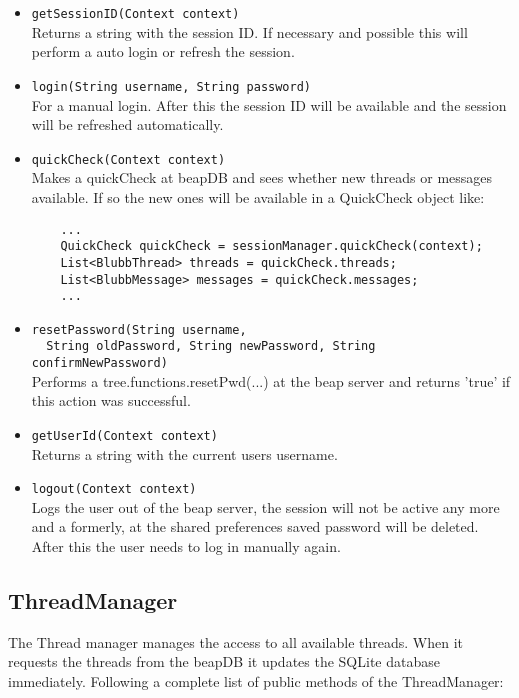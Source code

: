 \documentclass[12pt,a4paper,oneside]{report}
\newcommand{\beapDB}{beapDB}
\newcommand{\beapServer}{beap server}
\newcommand{\code}[1]{\lstinline{#1}}
\begin{document}
\begin{itemize}
\item{\code{getSessionID(Context context)}}\\
Returns a string with the session ID. If necessary and possible this will perform a auto login or refresh the session.

\item{\code{login(String username, String password)}}\\
For a manual login. After this the session ID will be available and the session will be refreshed automatically.

\item{\code{quickCheck(Context context)}}\\
Makes a quickCheck at \beapDB{} and sees whether new threads or messages available. If so the new ones will be available in a QuickCheck object like: 
\begin{lstlisting}
	...
	QuickCheck quickCheck = sessionManager.quickCheck(context);
	List<BlubbThread> threads = quickCheck.threads;
	List<BlubbMessage> messages = quickCheck.messages;
	...
\end{lstlisting}

\item{\code{resetPassword(String username,}\\
\code{	String oldPassword, String newPassword, String confirmNewPassword)}}\\
Performs a tree.functions.resetPwd(...) at the \beapServer{} and returns 'true' if this action was successful.

\item{\code{getUserId(Context context)}}\\
Returns a string with the current users username.

\item{\code{logout(Context context)}}\\
Logs the user out of the \beapServer{}, the session will not be active any more and a formerly, at the shared preferences saved password will be deleted. After this the user needs to log in manually again.
\end{itemize}

\subsection{ThreadManager}
The Thread manager manages the access to all available threads. When it requests the threads from the \beapDB{} it updates the SQLite database immediately. Following a complete list of public methods of the ThreadManager:
\end{document}
